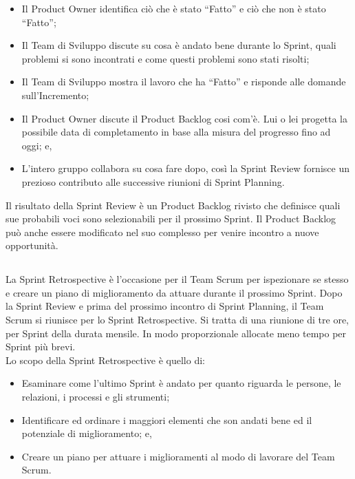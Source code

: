 \begin{itemize}
	\item Il Product Owner identifica ci\`o che \`e stato ``Fatto'' e ci\`o che non \`e stato ``Fatto'';
	\item Il Team di Sviluppo discute su cosa \`e andato bene durante lo Sprint, quali problemi si sono incontrati e come questi problemi  
	sono stati risolti;
	\item Il Team di Sviluppo mostra il lavoro che ha ``Fatto'' e risponde alle domande sull'Incremento;
	\item Il Product Owner discute il Product Backlog cosi com'\`e. Lui o lei progetta la possibile data di completamento in base alla 
	misura del progresso fino ad oggi; e,
	\item L'intero gruppo collabora su cosa fare dopo, cos\`i la Sprint Review fornisce un prezioso contributo alle successive riunioni 
	di Sprint Planning.     
\end{itemize}

Il risultato della Sprint Review \`e  un Product Backlog rivisto che definisce quali sue probabili voci sono selezionabili per 
il prossimo Sprint. Il Product Backlog pu\`o anche essere modificato nel suo complesso per venire incontro a nuove opportunit\`a.


\subsection*{\color{SteelBlue}{Sprint Retrospective}}%
\label{sec:sprint_retrospective}
La Sprint Retrospective \`e l'occasione per il Team Scrum per ispezionare se stesso e creare un piano di miglioramento da attuare durante 
il prossimo Sprint. Dopo la Sprint Review e prima del prossimo incontro di Sprint Planning, il Team Scrum si riunisce per lo Sprint
Retrospective. Si tratta di una riunione di tre ore, per Sprint della durata mensile. In modo proporzionale allocate meno tempo per Sprint 
pi\`u brevi. \newline
\\Lo scopo della Sprint Retrospective \`e quello di:

\begin{itemize}
	\item Esaminare come l'ultimo Sprint \`e andato per quanto riguarda le persone, le relazioni, i processi e gli strumenti;
	\item Identificare ed ordinare i maggiori elementi che son andati bene ed il potenziale di miglioramento; e,
	\item Creare un piano per attuare i miglioramenti al modo di lavorare del Team Scrum.
\end{itemize}

